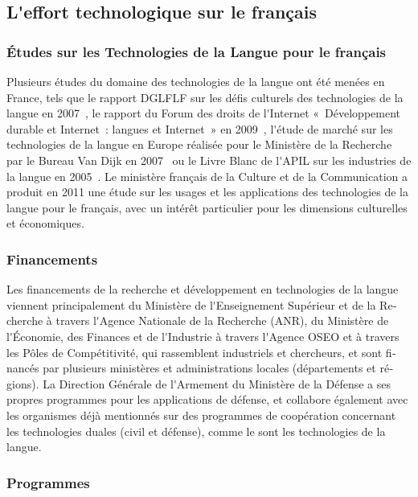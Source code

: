 \begin{french}
\begin{multicols}{2}
\subsection{L{\mbox '}effort technologique sur le français}

\subsubsection{Études sur les Technologies de la Langue pour le français}

Plusieurs études du domaine des technologies de la langue ont été
menées en France, tels que le rapport DGLFLF sur les défis culturels
des technologies de la langue en 2007~\cite{dglflf07}, le rapport du
Forum des droits de l{\mbox '}Internet «~Développement durable et
  Internet~: langues et Internet~» en 2009~\cite{droitsinternet07},
l{\mbox '}étude de marché sur les technologies de la langue en Europe
réalisée pour le Ministère de la Recherche par le Bureau Van Dijk en
2007~\cite{vandijk07} ou le Livre Blanc de l{\mbox '}APIL sur les
industries de la langue en 2005~\cite{apil05}. Le ministère français
de la Culture et de la Communication a produit en 2011 une étude sur
les usages et les applications des technologies de la langue pour le
français, avec un intérêt particulier pour les dimensions culturelles
et économiques.

\subsubsection{Financements}

Les financements de la recherche et développement en technologies de
la langue viennent principalement du Ministère de l{\mbox '}Enseignement
Supérieur et de la Recherche à travers l{\mbox '}Agence Nationale de la
Recherche (ANR), du Ministère de l{\mbox '}Économie, des Finances et de
l{\mbox '}Industrie à travers l{\mbox '}Agence OSEO et à travers les Pôles de
Compétitivité, qui rassemblent industriels et chercheurs, et sont
financés par plusieurs ministères et administrations locales
(départements et régions). La Direction Générale de l{\mbox '}Armement du
Ministère de la Défense a ses propres programmes pour les applications
de défense, et collabore également avec les organismes déjà mentionnés
sur des programmes de coopération concernant les technologies duales
(civil et défense), comme le sont les technologies de la langue.

\subsubsection{Programmes}


\end{multicols}
\end{french}
